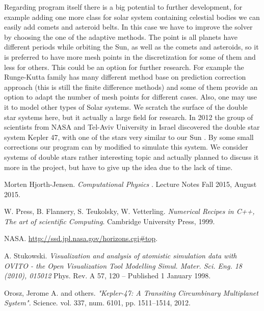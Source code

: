 \documentclass[10pt]{article}
\begin{document}
Regarding program itself there is a big potential to further development, for example adding one more class for solar system containing celestial bodies we can easily add comets and asteroid belts.
In this case we have to improve the solver by choosing the one of the adaptive methods. The point is all planets have different periods while orbiting the Sun, as well as the comets and asteroids,  so it is preferred to have more mesh points in the discretization for some of them and less for others. This could be an option for further research. For example the Runge-Kutta family has many different method base on prediction correction approach (this is still the finite difference methods) and some of them provide an option to adapt the number of mesh points for different cases.
 Also, one may use it to model other types of Solar systems. We scratch the surface of the double star systems here, but it actually a large field for research. In 2012 the group of scientists from NASA and Tel-Aviv University in Israel discovered the double star system Kepler 47, with one of the stars very similar to our Sun \cite{kepler}. By some small corrections our program can by modified to simulate this system. We consider systems of double stars rather interesting topic and actually planned to discuss it more in the project, but have to give up the idea due to the lack of time.

\newpage
\begin{thebibliography}{2}
Morten Hjorth-Jensen. 
\textit{Computational Physics
}. 
Lecture Notes Fall 2015, August 2015.

W. Press, B. Flannery, S. Teukolsky, W. Vetterling. 
\textit{Numerical Recipes in C++, The art of scientific Computing}. 
Cambridge University Press, 1999.

NASA.
\url{http://ssd.jpl.nasa.gov/horizons.cgi#top}.


A. Stukowski.
\textit{
Visualization and analysis of atomistic simulation data with OVITO - the Open Visualization Tool
Modelling Simul. Mater. Sci. Eng. 18 (2010), 015012}
Phys. Rev. A 57, 120 – Published 1 January 1998.

Orosz, Jerome A. and others.
\textit
{"Kepler-47: A Transiting Circumbinary Multiplanet System". 
}
Science. vol. 337, num. 6101, pp. 1511--1514, 2012. 
 
\end{thebibliography}
\end{document}
